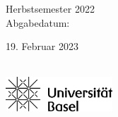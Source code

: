 \begin{center}

	Herbstsemester 2022\\
	Abgabedatum: {\large\date 019. Februar 2023}\\[2.5cm]


	\includegraphics[width=0.3\textwidth]{images/uni-basel-logo.png} %


	\end{center}

\restoregeometry

\newpage

